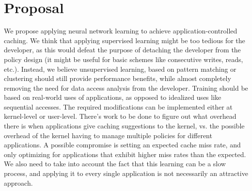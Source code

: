 \section{Proposal}

We propose applying neural network learning to achieve application-controlled
caching.  We think that applying supervised learning might be too tedious for
the developer, as this would defeat the purpose of detaching the developer from
the policy design (it might be useful for basic schemes like consecutive
writes, reads, etc.).  Instead, we believe unsupervised learning, based on
pattern matching or clustering should still provide performance benefits, while
almost completely removing the need for data access analysis from the
developer.  Training should be based on real-world uses of applications, as
opposed to idealized uses like sequential accesses.  The required modifications
can be implemented either at kernel-level or user-level.  There’s work to be
done to figure out what overhead there is when applications give caching
suggestions to the kernel, vs.  the possible overhead of the kernel having to
manage multiple policies for different applications.  A possible compromise is
setting an expected cache miss rate, and only optimizing for applications that
exhibit higher miss rates than the expected.  We also need to take into account
the fact that this learning can be a slow process, and applying it to every
single application is not necessarily an attractive approach.
